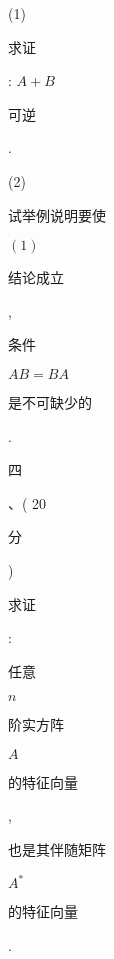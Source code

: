 \documentclass[10pt]{article}
\begin{document}
(1) \begin{CJK}{UTF8}{mj}求证\end{CJK}: $A+B$ \begin{CJK}{UTF8}{mj}可逆\end{CJK}.

(2) \begin{CJK}{UTF8}{mj}试举例说明要使\end{CJK} $(1)$ \begin{CJK}{UTF8}{mj}结论成立\end{CJK}, \begin{CJK}{UTF8}{mj}条件\end{CJK} $A B=B A$ \begin{CJK}{UTF8}{mj}是不可缺少的\end{CJK}.

\begin{CJK}{UTF8}{mj}四\end{CJK}、( 20 \begin{CJK}{UTF8}{mj}分\end{CJK}) \begin{CJK}{UTF8}{mj}求证\end{CJK}: \begin{CJK}{UTF8}{mj}任意\end{CJK} $n$ \begin{CJK}{UTF8}{mj}阶实方阵\end{CJK} $A$ \begin{CJK}{UTF8}{mj}的特征向量\end{CJK}, \begin{CJK}{UTF8}{mj}也是其伴随矩阵\end{CJK} $A^{*}$ \begin{CJK}{UTF8}{mj}的特征向量\end{CJK}.
\end{document}
